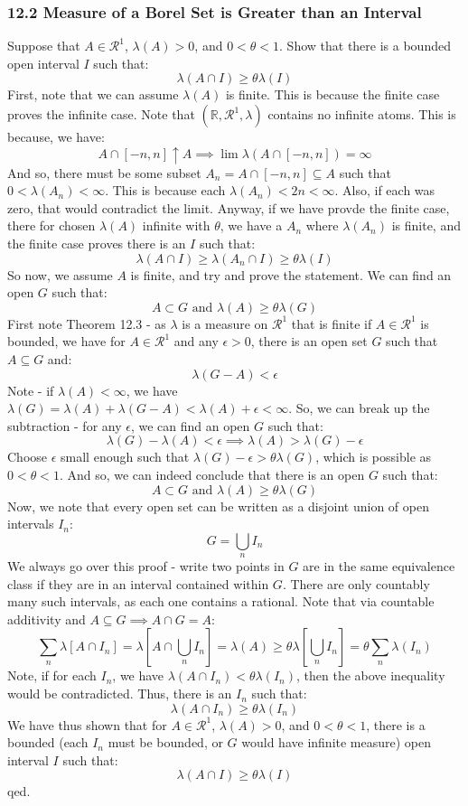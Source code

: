 \documentclass[12pt,a4paper]{article}
\newcommand{\1}[1]{\mathbbm{1}\left\{ #1 \right\}}
\newcommand{\R}{\mathbb{R}}
\newcommand{\rcal}{\mathcal{R}}
\begin{document}
\subsubsection{12.2 Measure of a Borel Set is Greater than an Interval} Suppose that $A \in \rcal^1$, $\lambda(A) > 0$, and $0 < \theta < 1$. Show that there is a bounded open interval $I$ such that:
$$
	\lambda(A \cap I) \geq \theta \lambda(I)
$$
First, note that we can assume $\lambda(A)$ is finite. This is because the finite case proves the infinite case. Note that $(\R,\rcal^1,\lambda)$ contains no infinite atoms. This is because, we have:
$$
	A \cap [-n,n] \uparrow A \implies
	\lim \lambda(A \cap [-n,n]) = \infty
$$
And so, there must be some subset $A_n = A \cap [-n,n] \subseteq A$ such that $0 < \lambda(A_n) < \infty$. This is because each $\lambda(A_n) < 2n < \infty$. Also, if each was zero, that would contradict the limit. Anyway, if we have provde the finite case, there for chosen $\lambda(A)$ infinite with $\theta$, we have a $A_n$ where $\lambda(A_n)$ is finite, and the finite case proves there is an $I$ such that:
$$
	\lambda(A \cap I) \geq \lambda(A_n \cap I) \geq \theta \lambda(I)
$$
So now, we assume $A$ is finite, and try and prove the statement. We can find an open $G$ such that:
$$
	A \subset G \text{ and } \lambda(A) \geq \theta\lambda(G)
$$
First note Theorem 12.3 - as $\lambda$ is a measure on $\rcal^1$ that is finite if $A \in \rcal^1$ is bounded, we have for $A \in \rcal^1$ and any $\epsilon > 0$, there is an open set $G$ such that $A \subseteq G$ and:
$$
	\lambda(G - A) < \epsilon
$$
Note - if $\lambda(A) < \infty$, we have $\lambda(G) = \lambda(A) + \lambda(G - A) < \lambda(A) + \epsilon < \infty$. So, we can break up the subtraction - for any $\epsilon$, we can find an open $G$ such that:
$$
	\lambda(G) - \lambda(A) < \epsilon \implies
	\lambda(A) > \lambda(G) - \epsilon
$$
Choose $\epsilon$ small enough such that $\lambda(G) - \epsilon > \theta\lambda(G)$, which is possible as $0 < \theta < 1$. And so, we can indeed conclude that there is an open $G$ such that:
$$
	A \subset G \text{ and } \lambda(A) \geq \theta\lambda(G)
$$
Now, we note that every open set can be written as a disjoint union of open intervals $I_n$:
$$
	G = \bigcup_n I_n
$$
We always go over this proof - write two points in $G$ are in the same equivalence class if they are in an interval contained within $G$. There are only countably many such intervals, as each one contains a rational. Note that via countable additivity and $A \subseteq G \implies A \cap G = A$:
$$
	\sum_n \lambda\left[A \cap I_n\right] =
	\lambda\left[A \cap \bigcup_n I_n\right] =
	\lambda(A) \geq \theta\lambda\left[\bigcup_n I_n\right] =
	\theta\sum_n \lambda(I_n)
$$
Note, if for each $I_n$, we have $\lambda(A \cap I_n) < \theta \lambda(I_n)$, then the above inequality would be contradicted. Thus, there is an $I_n$ such that:
$$
	\lambda(A \cap I_n) \geq \theta \lambda(I_n)
$$
We have thus shown that for $A \in \rcal^1$, $\lambda(A) > 0$, and $0 < \theta < 1$, there is a bounded (each $I_n$ must be bounded, or $G$ would have infinite measure) open interval $I$ such that:
$$
	\lambda(A \cap I) \geq \theta \lambda(I)
$$
qed.
\end{document}
